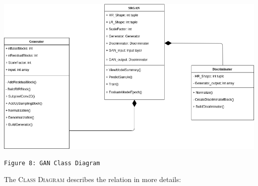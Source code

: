 \documentclass[12pt]{article}
\begin{document}
			\begin{center}
				\vspace{0.1in}
				\includegraphics[width=6in]{Images/ClassDiagram.png}
				
				\texttt{Figure 8: GAN Class Diagram}
				\vspace{0.1in}
			\end{center}
			The \textsc{Class Diagram} describes the relation in more details:
\end{document}
